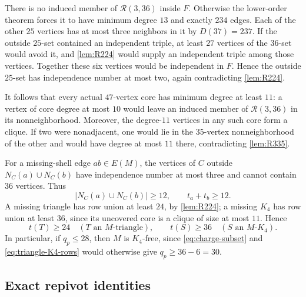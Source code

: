 There is no induced member of $\mathcal R(3,36)$ inside $F$. Otherwise the lower-order theorem forces it to have minimum degree $13$ and exactly $234$ edges. Each of the other $25$ vertices has at most three neighbors in it by $D(37)=237$. If the outside $25$-set contained an independent triple, at least $27$ vertices of the $36$-set would avoid it, and \cref{lem:R224} would supply an independent triple among those vertices. Together these six vertices would be independent in $F$. Hence the outside $25$-set has independence number at most two, again contradicting \cref{lem:R224}.

It follows that every actual $47$-vertex core has minimum degree at least $11$: a vertex of core degree at most $10$ would leave an induced member of $\mathcal R(3,36)$ in its nonneighborhood. Moreover, the degree-$11$ vertices in any such core form a clique. If two were nonadjacent, one would lie in the $35$-vertex nonneighborhood of the other and would have degree at most $11$ there, contradicting \cref{lem:R335}.

For a missing-shell edge $ab\in E(M)$, the vertices of $C$ outside $N_C(a)\cup N_C(b)$ have independence number at most three and cannot contain $36$ vertices. Thus
\begin{equation}
|N_C(a)\cup N_C(b)|\geq12,\qquad t_a+t_b\geq12.
\label{eq:EDGE12}
\end{equation}
A missing triangle has row union at least $24$, by \cref{lem:R224}; a missing $K_4$ has row union at least $36$, since its uncovered core is a clique of size at most $11$. Hence
\begin{equation}
t(T)\geq24\quad(T\text{ an }M\text{-triangle}),\qquad
t(S)\geq36\quad(S\text{ an }M\text{-}K_4).
\label{eq:triangle-K4-rows}
\end{equation}
In particular, if $q_p\leq28$, then $M$ is $K_4$-free, since \cref{eq:charge-subset} and \cref{eq:triangle-K4-rows} would otherwise give $q_p\geq36-6=30$.

\subsection{Exact repivot identities}

